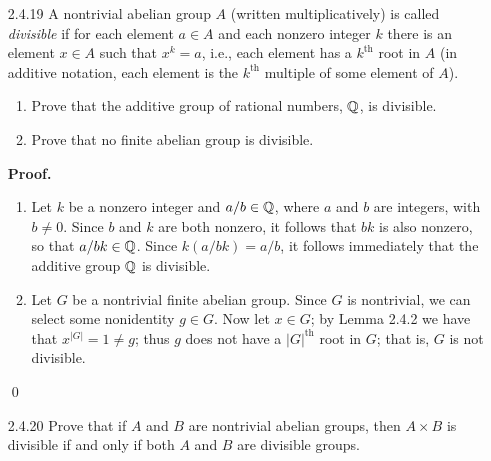 \begin{enumerate}
\begin{enumerate}
               $H = H_k$ for some positive integer $k$. By Exercise 2.4.18(b),
               we have that $H_k \lneq H_{k+1}$. Note that
               $|H_{k+1}| = p^{k+1}$, so that $H_{k+1} \neq Z$, since $Z$ is
               infinite. Thus a proper subgroup of $Z$---not equal to
               $H$---contains $H$, contradicting the maximality of $H$. Thus
               $Z$ is not finitely generated.
      \end{enumerate} \qed
   \item[2.4.19]  A nontrivial abelian group $A$ (written multiplicatively) is
                  called \textit{divisible} if for each element $a \in A$ and
                  each nonzero integer $k$ there is an element $x \in A$ such
                  that $x^k = a$, i.e., each element has a $k^{\text{th}}$ root
                  in $A$ (in additive notation, each element is the
                  $k^{\text{th}}$ multiple of some element of $A$).
                  \begin{enumerate}
                     \item Prove that the additive group of rational numbers,
                           $\mathbb{Q}$, is divisible.
                     \item Prove that no finite abelian group is divisible.
                  \end{enumerate}
                  
      \textbf{Proof.}
      
      \begin{enumerate}
         \item Let $k$ be a nonzero integer and $a/b \in \mathbb{Q}$, where $a$ and $b$
               are integers, with $b \neq 0$. Since $b$ and $k$ are both
               nonzero, it follows that $bk$ is also nonzero, so that
               $a/bk \in \mathbb{Q}$. Since $k(a/bk) = a/b$, it follows immediately that
               the additive group $\mathbb{Q}$ is divisible.
         \item Let $G$ be a nontrivial finite abelian group. Since $G$ is
               nontrivial, we can select some nonidentity $g \in G$. Now let
               $x \in G$; by Lemma 2.4.2 we have that $x^{|G|} = 1 \neq g$; thus 
               $g$ does not have a $|G|^{\text{th}}$ root in $G$; that is, $G$ 
               is not divisible. 
      \end{enumerate} \qed
   \item[2.4.20]  Prove that if $A$ and $B$ are nontrivial abelian groups, then
                  $A \times B$ is divisible if and only if both $A$ and $B$ are
                  divisible groups.
                  

\end{enumerate}
